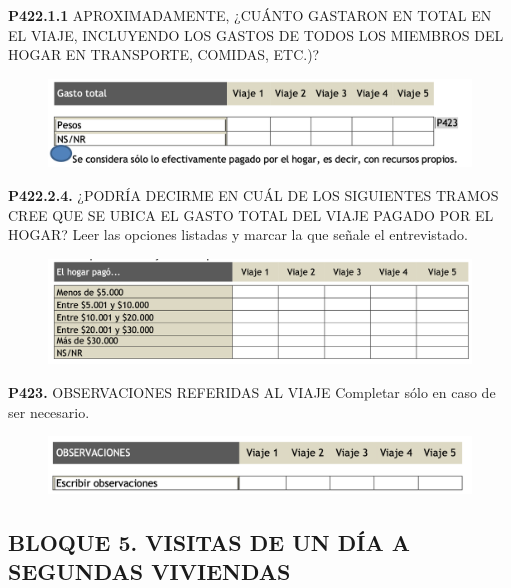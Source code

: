 \documentclass[
  openany]{book}
\begin{document}
\textbf{P422.1.1} APROXIMADAMENTE, ¿CUÁNTO GASTARON EN TOTAL EN EL VIAJE, INCLUYENDO
LOS GASTOS DE TODOS LOS MIEMBROS DEL HOGAR EN TRANSPORTE, COMIDAS, ETC.)?

\begin{figure}

{\centering \includegraphics[width=1\linewidth]{imagenes/figura6-188} 

}

\end{figure}

\textbf{P422.2.4.} ¿PODRÍA DECIRME EN CUÁL DE LOS SIGUIENTES TRAMOS CREE QUE SE UBICA EL GASTO TOTAL DEL VIAJE PAGADO POR EL HOGAR?
Leer las opciones listadas y marcar la que señale el entrevistado.

\begin{figure}

{\centering \includegraphics[width=1\linewidth]{imagenes/figura6-189} 

}

\end{figure}

\textbf{P423.} OBSERVACIONES REFERIDAS AL VIAJE
Completar sólo en caso de ser necesario.

\begin{figure}

{\centering \includegraphics[width=1\linewidth]{imagenes/figura6-190} 

}

\end{figure}

\hypertarget{bloque-5.-visitas-de-un-duxeda-a-segundas-viviendas}{%
\subsection{\texorpdfstring{\textbf{BLOQUE 5. VISITAS DE UN DÍA A SEGUNDAS VIVIENDAS}}{BLOQUE 5. VISITAS DE UN DÍA A SEGUNDAS VIVIENDAS}}\label{bloque-5.-visitas-de-un-duxeda-a-segundas-viviendas}}
\end{document}
